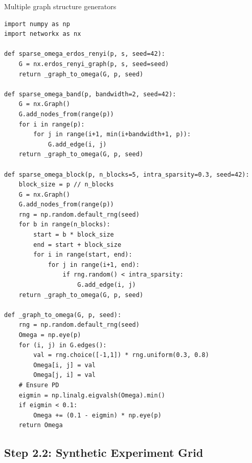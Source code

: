 \documentclass[11pt,a4paper]{article}
\begin{document}
\begin{code}{Multiple graph structure generators}
\begin{lstlisting}
import numpy as np
import networkx as nx

def sparse_omega_erdos_renyi(p, s, seed=42):
    G = nx.erdos_renyi_graph(p, s, seed=seed)
    return _graph_to_omega(G, p, seed)

def sparse_omega_band(p, bandwidth=2, seed=42):
    G = nx.Graph()
    G.add_nodes_from(range(p))
    for i in range(p):
        for j in range(i+1, min(i+bandwidth+1, p)):
            G.add_edge(i, j)
    return _graph_to_omega(G, p, seed)

def sparse_omega_block(p, n_blocks=5, intra_sparsity=0.3, seed=42):
    block_size = p // n_blocks
    G = nx.Graph()
    G.add_nodes_from(range(p))
    rng = np.random.default_rng(seed)
    for b in range(n_blocks):
        start = b * block_size
        end = start + block_size
        for i in range(start, end):
            for j in range(i+1, end):
                if rng.random() < intra_sparsity:
                    G.add_edge(i, j)
    return _graph_to_omega(G, p, seed)

def _graph_to_omega(G, p, seed):
    rng = np.random.default_rng(seed)
    Omega = np.eye(p)
    for (i, j) in G.edges():
        val = rng.choice([-1,1]) * rng.uniform(0.3, 0.8)
        Omega[i, j] = val
        Omega[j, i] = val
    # Ensure PD
    eigmin = np.linalg.eigvalsh(Omega).min()
    if eigmin < 0.1:
        Omega += (0.1 - eigmin) * np.eye(p)
    return Omega
\end{lstlisting}
\end{code}

\subsection{Step 2.2: Synthetic Experiment Grid}
\end{document}

